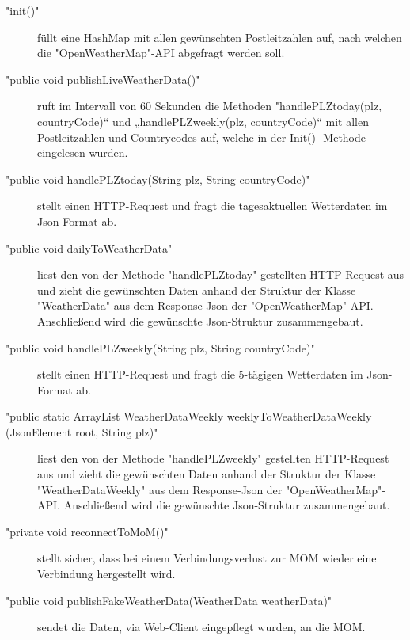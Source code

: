 \begin{description}
\item["init()"] füllt eine HashMap mit allen gewünschten Postleitzahlen auf, nach welchen die "OpenWeatherMap"-API abgefragt werden soll.
\item["public void publishLiveWeatherData()"] ruft im Intervall von 60 Sekunden die Methoden "handlePLZtoday(plz, countryCode)“ und „handlePLZweekly(plz, countryCode)“ mit allen Postleitzahlen und Countrycodes auf, welche in der Init() -Methode eingelesen wurden. 
\item["public void handlePLZtoday(String plz, String countryCode)"] stellt einen HTTP-Request und fragt die tagesaktuellen Wetterdaten im Json-Format ab.
\item["public void dailyToWeatherData"] liest den von der Methode "handlePLZtoday" gestellten HTTP-Request aus und zieht die gewünschten Daten anhand der Struktur der Klasse "WeatherData" aus dem Response-Json der "OpenWeatherMap"-API. Anschließend wird  die gewünschte Json-Struktur zusammengebaut. 
\item["public void handlePLZweekly(String plz, String countryCode)"]stellt einen HTTP-Request und fragt die 5-tägigen Wetterdaten im Json-Format ab.
\item["public static ArrayList WeatherDataWeekly weeklyToWeatherDataWeekly
(JsonElement root, String plz)" ]liest den von der Methode "handlePLZweekly" gestellten HTTP-Request aus und zieht die gewünschten Daten anhand der Struktur der Klasse "WeatherDataWeekly" aus dem Response-Json der "OpenWeatherMap"-API. Anschließend wird die gewünschte Json-Struktur zusammengebaut.
\item["private void reconnectToMoM()"] stellt sicher, dass bei einem Verbindungsverlust zur MOM wieder eine Verbindung hergestellt wird. 
\item["public void publishFakeWeatherData(WeatherData weatherData)"] sendet die Daten, via Web-Client eingepflegt wurden, an die MOM. 
\end{description}

